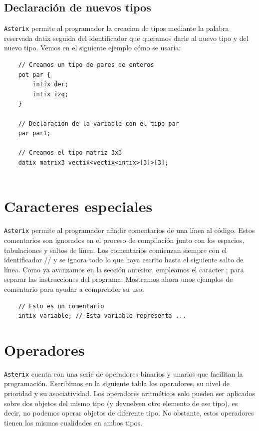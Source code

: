 \documentclass[a4paper, 9pt]{article}
\newcommand{\atx}{\texttt{Asterix} }
\begin{document}
    \subsection*{Declaración de nuevos tipos}
    \atx permite al programador la creacion de tipos mediante la palabra reservada 
    \textsf{datix} seguida del identificador que queramos darle al nuevo tipo
    y del nuevo tipo. Vemos en el siguiente ejemplo cómo se usaría:

    \begin{verbatim}
    // Creamos un tipo de pares de enteros
    pot par {
        intix der;
        intix izq;
    }

    // Declaracion de la variable con el tipo par
    par par1;

    // Creamos el tipo matriz 3x3
    datix matrix3 vectix<vectix<intix>[3]>[3];
    
    \end{verbatim}


    \section*{Caracteres especiales}
    \atx permite al programador añadir comentarios de una línea al código. Estos
    comentarios son ignorados en el proceso de compilación junto con los espacios,
    tabulaciones y saltos de línea. Los comentarios comienzan siempre con el
    identificador // y se ignora todo lo que haya escrito hasta el siguiente
    salto de línea. Como ya avanzamos en la sección anterior, empleamos el
    caracter \textsc{;} para separar las instrucciones del programa. Mostramos
    ahora unos ejemplos de comentario para ayudar a comprender su uso:

    \begin{verbatim}
    // Esto es un comentario
    intix variable; // Esta variable representa ...
    \end{verbatim}

    \section*{Operadores}
    \atx cuenta con una serie de operadores binarios y unarios que facilitan
    la programación. 
    Escribimos en la siguiente tabla los operadores, su nivel de prioridad y 
    su asociatividad. Los operadores aritméticos solo pueden ser aplicados 
    sobre dos objetos del mismo tipo (y devuelven otro elemento de ese tipo),
    es decir, no podemos operar objetos de diferente tipo. No obstante, estos
    operadores tienen las mismas cualidades en ambos tipos.
\end{document}
